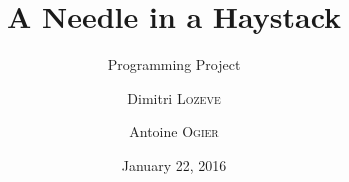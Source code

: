 \usepackage{fontspec}

\setmainfont{Linux Libertine O}
\setsansfont{Linux Biolinum O}
\setmonofont[Scale=0.83]{Bitstream Vera Sans Mono}

\usepackage{polyglossia}
\setdefaultlanguage{english}

\usepackage{graphicx}
\usepackage{xcolor}
\usepackage{wrapfig}
\usepackage{subfig}
\usepackage{lettrine}
\usepackage{booktabs}
\usepackage{multirow}
\usepackage{amsmath,amssymb}

\usepackage{smartdiagram}

\usepackage{pdfpages}

\usepackage{microtype}



\usepackage{minted}



\author{Dimitri \textsc{Lozeve} \and Antoine \textsc{Ogier}}
\date{January 22, 2016}
\title{A Needle in a Haystack}
\subtitle{Programming Project}







